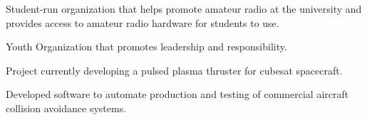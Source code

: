 \documentclass[letterpaper,ddMMMyyyy,nonstopmode]{simpleresumecv}
\newcommand{\descriptionWidth}{33em}
\newenvironment{Description}
{%
	\SmallGap
	\par
	\begin{Detail}
		\Item
		\begin{minipage}{\descriptionWidth}
}
{\par
\end{minipage}
\end{Detail}
}
\begin{document}
\begin{Body}

            \begin{Description}
                Student-run organization that helps promote amateur radio at the university and provides access to amateur radio hardware for students to use.

            \end{Description}

            \Gap

            \begin{Description}
                    Youth Organization that promotes leadership and responsibility.
            \end{Description}




            \begin{Description}
                Project currently developing a pulsed plasma thruster for cubesat spacecraft.
            \end{Description}



                \begin{Description}
                    Developed software to automate production and testing of commercial aircraft collision avoidance systems.
                \end{Description}
            \Gap



\end{Body}
\end{document}
